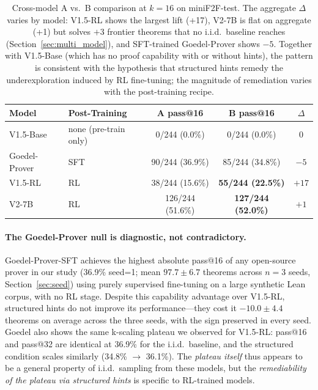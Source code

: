 \documentclass{article}
\begin{document}
\begin{table}[t]
\centering
\small
\begin{tabular}{llccc}
\toprule
\textbf{Model} & \textbf{Post-Training} & \textbf{A pass@16} & \textbf{B pass@16} & \textbf{$\Delta$} \\
\midrule
V1.5-Base    & none (pre-train only) & 0/244 (0.0\%)    & 0/244 (0.0\%)    & 0    \\
Goedel-Prover & SFT                  & 90/244 (36.9\%)  & 85/244 (34.8\%)  & $-5$ \\
\midrule
V1.5-RL      & RL                    & 38/244 (15.6\%)  & \textbf{55/244 (22.5\%)} & $+17$ \\
V2-7B        & RL                    & 126/244 (51.6\%) & \textbf{127/244 (52.0\%)} & $+1$ \\
\bottomrule
\end{tabular}
\caption{Cross-model A vs.\ B comparison at $k{=}16$ on miniF2F-test. The aggregate $\Delta$ varies by model: V1.5-RL shows the largest lift (+17), V2-7B is flat on aggregate (+1) but solves $+3$ frontier theorems that no i.i.d.\ baseline reaches (Section~\ref{sec:multi_model}), and SFT-trained Goedel-Prover shows $-5$. Together with V1.5-Base (which has no proof capability with or without hints), the pattern is consistent with the hypothesis that structured hints remedy the underexploration induced by RL fine-tuning; the magnitude of remediation varies with the post-training recipe.}
\label{tab:cross_model}
\end{table}

\paragraph{The Goedel-Prover null is diagnostic, not contradictory.} Goedel-Prover-SFT achieves the highest absolute pass@16 of any open-source prover in our study (36.9\% seed=1; mean $97.7 \pm 6.7$ theorems across $n{=}3$ seeds, Section~\ref{sec:seed}) using purely supervised fine-tuning on a large synthetic Lean corpus, with no RL stage. Despite this capability advantage over V1.5-RL, structured hints do not improve its performance---they cost it $-10.0 \pm 4.4$ theorems on average across the three seeds, with the sign preserved in every seed. Goedel also shows the same k-scaling plateau we observed for V1.5-RL: pass@16 and pass@32 are identical at 36.9\% for the i.i.d.\ baseline, and the structured condition scales similarly (34.8\% $\to$ 36.1\%). The \emph{plateau itself} thus appears to be a general property of i.i.d.\ sampling from these models, but the \emph{remediability of the plateau via structured hints} is specific to RL-trained models.
\end{document}
